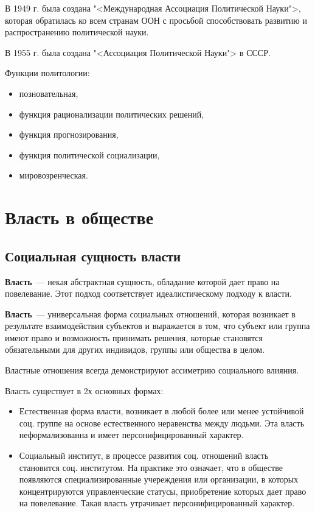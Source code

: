 В 1949 г. была создана "<Международная Ассоциация Политической Науки">, которая обратилась ко всем странам ООН с просьбой способствовать развитию и распространению политической науки.

В 1955 г. была создана "<Ассоциация Политической Науки"> в СССР.

Функции политологии:
\begin{itemize}
	\item позновательная,
	\item функция рационализации политических решений,
	\item функция прогнозирования,
	\item функция политической социализации,
	\item мировозренческая.
\end{itemize}

\section{Власть в обществе}
\subsection{Социальная сущность власти}
\textbf{Власть}~--- некая абстрактная сущность, обладание которой дает право на повелевание. Этот подход соответствует идеалистическому подходу к власти.

\textbf{Власть}~--- универсальная форма социальных отношений, которая возникает в результате взаимодействия субъектов и выражается в том, что субъект или группа имеют право и возможность принимать решения, которые становятся обязательными для других индивидов, группы или общества в целом.

Властные отношения всегда демонстрируют ассиметрию социального влияния.

Власть существует в 2х основных формах:
\begin{itemize}
	\item Естественная форма власти, возникает в любой более или менее устойчивой соц. группе на основе естественного неравенства между людьми. Эта власть неформализованна и имеет персонифицированный характер.
	\item Социальный институт, в процессе развития соц. отношений власть становится соц. институтом. На практике это означает, что в обществе появляются специализированные учереждения или организации, в которых концентрируются управленческие статусы, приобретение которых дает право на повелевание. Такая власть утрачивает персонифицированный характер.
\end{itemize}

